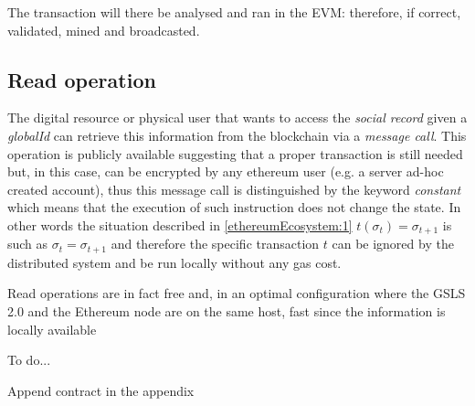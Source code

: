 The transaction will there be analysed and ran in the EVM: therefore, if correct, validated, mined and broadcasted.


\subsection{Read operation}

The digital resource or physical user that wants to access the \textit{social record} given a \textit{globalId} can retrieve this information from the blockchain via a \textit{message call}.
This operation is publicly available suggesting that a proper transaction is still needed but, in this case, can be encrypted by any ethereum user (e.g. a server ad-hoc created account), thus this message call is distinguished by the keyword \textit{constant} which means that the execution of such instruction does not change the state.
In other words the situation described in \ref{ethereumEcosystem:1} $t(\sigma_t) = \sigma_{t+1}$ is such as $\sigma_t = \sigma_{t+1}$ and therefore the specific transaction $t$ can be ignored by the distributed system and be run locally without any gas cost.

Read operations are in fact free and, in an optimal configuration where the GSLS 2.0 and the Ethereum node are on the same host, fast since the information is locally available

\begin{notation}
  To do...
\end{notation}


\begin{notation}
  Append contract in the appendix
\end{notation}